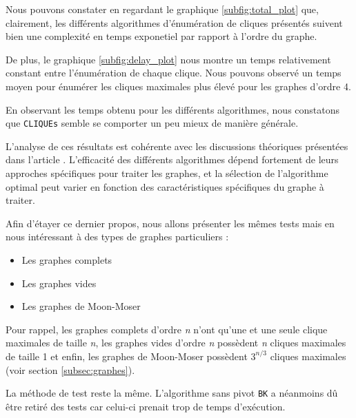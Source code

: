 \documentclass[12pt,a4paper]{article}
\begin{document}
Nous pouvons constater en regardant le graphique \ref{subfig:total_plot} que, clairement, les différents algorithmes d'énumération de cliques présentés suivent bien une complexité en temps exponetiel par rapport à l'ordre du graphe.

De plus, le graphique \ref{subfig:delay_plot} nous montre un temps relativement constant entre l'énumération de chaque clique. Nous pouvons observé un temps moyen pour énumérer les cliques maximales plus élevé pour les graphes d'ordre 4.

En observant les temps obtenu pour les différents algorithmes, nous constatons que \texttt{CLIQUEs} semble se comporter un peu mieux de manière générale.

L'analyse de ces résultats est cohérente avec les discussions théoriques présentées dans l'article \cite{CONTE20221}. L'efficacité des différents algorithmes dépend fortement de leurs approches spécifiques pour traiter les graphes, et la sélection de l'algorithme optimal peut varier en fonction des caractéristiques spécifiques du graphe à traiter.

Afin d'étayer ce dernier propos, nous allons présenter les mêmes tests mais en nous intéressant à des types de graphes particuliers :
\begin{itemize}
  \item Les graphes complets
  \item Les graphes vides
  \item Les graphes de Moon-Moser
\end{itemize}
Pour rappel, les graphes complets d'ordre \emph{n} n'ont qu'une et une seule clique maximales de taille \emph{n}, les graphes vides d'ordre \emph{n} possèdent \emph{n} cliques maximales de taille 1 et enfin, les graphes de Moon-Moser possèdent \(3^{n/3}\) cliques maximales (voir section \ref{subsec:graphes}).

La méthode de test reste la même. L'algorithme sans pivot \texttt{BK} a néanmoins dû être retiré des tests car celui-ci prenait trop de temps d'exécution.
\end{document}
